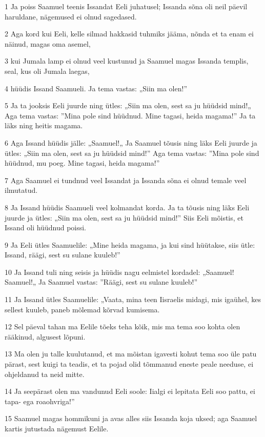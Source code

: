 \par 1 Ja poiss Saamuel teenis Issandat Eeli juhatusel; Issanda sõna oli neil päevil haruldane, nägemused ei olnud sagedased.
\par 2 Aga kord kui Eeli, kelle silmad hakkasid tuhmiks jääma, nõnda et ta enam ei näinud, magas oma asemel,
\par 3 kui Jumala lamp ei olnud veel kustunud ja Saamuel magas Issanda templis, seal, kus oli Jumala laegas,
\par 4 hüüdis Issand Saamueli. Ja tema vastas: „Siin ma olen!”
\par 5 Ja ta jooksis Eeli juurde ning ütles: „Siin ma olen, sest sa ju hüüdsid mind!„ Aga tema vastas: ”Mina pole sind hüüdnud. Mine tagasi, heida magama!” Ja ta läks ning heitis magama.
\par 6 Aga Issand hüüdis jälle: „Saamuel!„ Ja Saamuel tõusis ning läks Eeli juurde ja ütles: „Siin ma olen, sest sa ju hüüdsid mind!” Aga tema vastas: ”Mina pole sind hüüdnud, mu poeg. Mine tagasi, heida magama!”
\par 7 Aga Saamuel ei tundnud veel Issandat ja Issanda sõna ei olnud temale veel ilmutatud.
\par 8 Ja Issand hüüdis Saamueli veel kolmandat korda. Ja ta tõusis ning läks Eeli juurde ja ütles: „Siin ma olen, sest sa ju hüüdsid mind!” Siis Eeli mõistis, et Issand oli hüüdnud poissi.
\par 9 Ja Eeli ütles Saamuelile: „Mine heida magama, ja kui sind hüütakse, siis ütle: Issand, räägi, sest su sulane kuuleb!”
\par 10 Ja Issand tuli ning seisis ja hüüdis nagu eelmistel kordadel: „Saamuel! Saamuel!„ Ja Saamuel vastas: ”Räägi, sest su sulane kuuleb!”
\par 11 Ja Issand ütles Saamuelile: „Vaata, mina teen Iisraelis midagi, mis igaühel, kes sellest kuuleb, paneb mõlemad kõrvad kumisema.
\par 12 Sel päeval tahan ma Eelile tõeks teha kõik, mis ma tema soo kohta olen rääkinud, algusest lõpuni.
\par 13 Ma olen ju talle kuulutanud, et ma mõistan igavesti kohut tema soo üle patu pärast, sest kuigi ta teadis, et ta pojad olid tõmmanud eneste peale needuse, ei ohjeldanud ta neid mitte.
\par 14 Ja seepärast olen ma vandunud Eeli soole: Iialgi ei lepitata Eeli soo pattu, ei tapa- ega roaohvriga!”
\par 15 Saamuel magas hommikuni ja avas alles siis Issanda koja uksed; aga Saamuel kartis jutustada nägemust Eelile.
